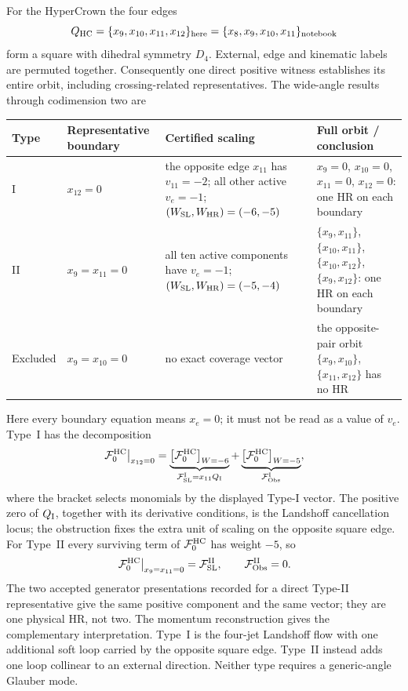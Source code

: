 \documentclass[a4paper,11pt]{article}
\newcommand{\WSL}{W_{\rm SL}}
\newcommand{\WHR}{W_{\rm HR}}
\begin{document}
For the HyperCrown the four edges
\begin{equation}
 Q_{\rm HC}=\{x_9,x_{10},x_{11},x_{12}\}_{\rm here}
 =\{x_8,x_9,x_{10},x_{11}\}_{\rm notebook}
\end{equation}
form a square with dihedral symmetry \(D_4\).  External, edge and kinematic
labels are permuted together.  Consequently one direct positive witness
establishes its entire orbit, including crossing-related representatives.
The wide-angle results through codimension two are
\begin{center}
\small
\begin{tabular}{@{}
 >{\raggedright\arraybackslash}p{}
 >{\raggedright\arraybackslash}p{}
 >{\raggedright\arraybackslash}p{}
 >{\raggedright\arraybackslash}p{}@{}}
\toprule
Type & Representative boundary & Certified scaling & Full orbit / conclusion\\
\midrule
I & \(x_{12}=0\) & the opposite edge \(x_{11}\) has \(v_{11}=-2\);
all other active \(v_e=-1\); \((\WSL,\WHR)=(-6,-5)\)
& \(x_9=0\), \(x_{10}=0\), \(x_{11}=0\), \(x_{12}=0\): one HR on each boundary\\[1mm]
II & \(x_9=x_{11}=0\) & all ten active components have \(v_e=-1\);
\((\WSL,\WHR)=(-5,-4)\)
& \(\{x_9,x_{11}\}\), \(\{x_{10},x_{11}\}\),
\(\{x_{10},x_{12}\}\), \(\{x_9,x_{12}\}\): one HR on each boundary\\[1mm]
Excluded & \(x_9=x_{10}=0\) & no exact coverage vector & the opposite-pair
orbit \(\{x_9,x_{10}\}\), \(\{x_{11},x_{12}\}\) has no HR\\
\bottomrule
\end{tabular}
\end{center}
Here every boundary equation means \(x_e=0\); it must not be read as a value
of \(v_e\).  Type~I has the decomposition
\begin{equation}
 \left.\mathcal F_0^{\rm HC}\right|_{x_{12}=0}
 =\underbrace{\left[\mathcal F_0^{\rm HC}\right]_{W=-6}}_{\mathcal F_{\rm SL}^{\rm I}
 =x_{11}Q_{\rm I}}
 +\underbrace{\left[\mathcal F_0^{\rm HC}\right]_{W=-5}}_{\mathcal F_{\rm Obs}^{\rm I}},
 \label{eq:HC-type-I-decomposition}
\end{equation}
where the bracket selects monomials by the displayed Type-I vector.  The
positive zero of \(Q_{\rm I}\), together with its derivative conditions, is
the Landshoff cancellation locus; the obstruction fixes the extra unit of
scaling on the opposite square edge.  For Type~II every surviving term of
\(\mathcal F_0^{\rm HC}\) has weight \(-5\), so
\begin{equation}
 \left.\mathcal F_0^{\rm HC}\right|_{x_9=x_{11}=0}
 =\mathcal F_{\rm SL}^{\rm II},
 \qquad \mathcal F_{\rm Obs}^{\rm II}=0.
 \label{eq:HC-type-II-decomposition}
\end{equation}
The two accepted generator presentations recorded for a direct Type-II
representative give the same positive component and the same vector; they are
one physical HR, not two.
The momentum reconstruction gives the complementary interpretation.  Type~I
is the four-jet Landshoff flow with one additional soft loop carried by the
opposite square edge.  Type~II instead adds one loop collinear to an external
direction.  Neither type requires a generic-angle Glauber mode.
\end{document}
